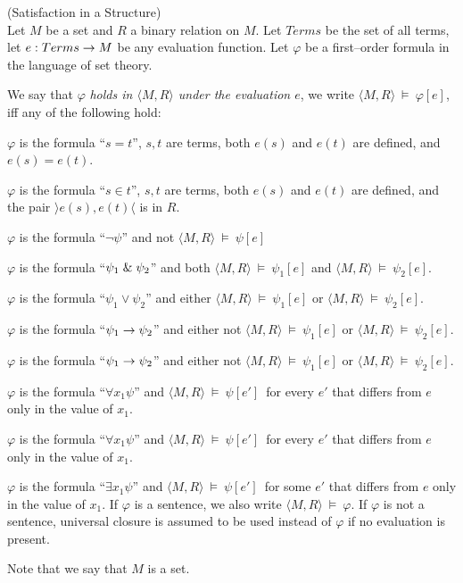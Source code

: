\begin{definition}{(Satisfaction in a Structure)}\label{def:satisfaction}\\
Let $M$ be a set and $R$ a binary relation on $M$. Let $Terms$ be the set of all terms, let $e: Terms \rightarrow M$ be any evaluation function. Let $\varphi$  be a first–order formula in the language of set theory.

We say that $\varphi$ \emph{holds in $\langle M, R \rangle$ under the evaluation $e$}, we write $\langle M, R \rangle~\models~\varphi[e]$, iff any of the following hold:
\bce[(i)]
\item $\varphi$ is the formula ``$s = t$'', $s, t$ are terms, both $e(s)$ and $e(t)$ are defined, and $e(s) = e(t)$.
\item $\varphi$ is the formula ``$s \in t$'', $s, t$ are terms, both $e(s)$ and $e(t)$ are defined, and the pair $\rangle e(s), e(t) \langle$ is in $R$.
\item $\varphi$ is the formula ``$\neg\psi$'' and not $\langle M, R \rangle~\models~\psi[e]$
\item $\varphi$ is the formula ``$\psi_1 \mathrel{\&} \psi_2$'' and both $\langle M, R \rangle~\models~\psi_1[e]$ and $\langle M, R \rangle~\models~\psi_2[e]$.
\item $\varphi$ is the formula ``$\psi_1 \lor \psi_2$'' and either $\langle M, R \rangle~\models~\psi_1[e]$ or $\langle M, R \rangle~\models~\psi_2[e]$.
\item $\varphi$ is the formula ``$\psi_1 \rightarrow \psi_2$'' and either not $\langle M, R \rangle~\models~\psi_1[e]$ or $\langle M, R \rangle~\models~\psi_2[e]$.
\item $\varphi$ is the formula ``$\psi_1 \rightarrow \psi_2$'' and either not $\langle M, R \rangle~\models~\psi_1[e]$ or $\langle M, R \rangle~\models~\psi_2[e]$.
\item $\varphi$ is the formula ``$\forall x_1 \psi$'' and $\langle M, R \rangle~\models~\psi[e']$ for every $e'$ that differs from $e$ only in the value of $x_1$.
\item $\varphi$ is the formula ``$\forall x_1 \psi$'' and $\langle M, R \rangle~\models~\psi[e']$ for every $e'$ that differs from $e$ only in the value of $x_1$.
\item $\varphi$ is the formula ``$\exists x_1 \psi$'' and $\langle M, R \rangle~\models~\psi[e']$ for some $e'$ that differs from $e$ only in the value of $x_1$.
\ece
If $\varphi$ is a sentence, we also write $\langle M, R \rangle~\models~\varphi$. If $\varphi$ is not a sentence, universal closure is assumed to be used instead of $\varphi$ if no evaluation is present.
\end{definition}
Note that we say that $M$ is a set. 

